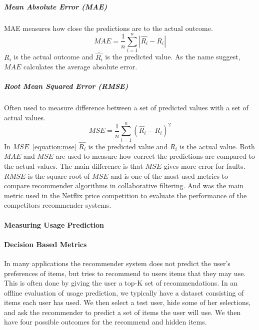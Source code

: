 \subparagraph{Mean Absolute Error (MAE)}
MAE measures how close the predictions are to the actual outcome.
\begin{equation}
    MAE = \frac{1}{n}\sum_{i=1}^{n}{|\hat{R_i}-R_i|}
    \label{equation:mae}
\end{equation}
$R_i$ is the actual outcome and $\hat{R_i}$ is the predicted value.
As the name suggest, $MAE$ calculates the average absolute error.

\subparagraph{Root Mean Squared Error (RMSE)}
Often used to measure difference between a set of predicted values with a set of actual values.
\begin{equation}
    MSE = \frac{1}{n}\sum_{i=1}^{n}{(\hat{R_i} - R_i)^{2}}
    \label{equation:mse}
\end{equation}
In $MSE$~\ref{equation:mse} $\hat{R_i}$ is the predicted value and $R_i$ is the actual value.
Both $MAE$ and $MSE$ are used to measure how correct the predictions are compared to the actual values.
The main difference is that $MSE$ gives more error for faults.
$RMSE$ is the square root of $MSE$ and is one of the most used metrics to compare recommender algorithms in collaborative filtering.
And was the main metric used in the Netflix price competition to evaluate the performance of the competitors recommender systems.




\paragraph{Measuring Usage Prediction}
\paragraph{Decision Based Metrics}
In many applications the recommender system does not predict the user's
preferences of items, but tries to recommend to users items that they may use.
This is often done by giving the user a top-K set of recommendations.
In an offline evaluation of usage prediction, we typically have a dataset
consisting of items each user has used. We then select a test user, hide some
of her selections, and ask the recommender to predict a set of items the user
will use. We then have four possible outcomes for the recommend and hidden
items.

